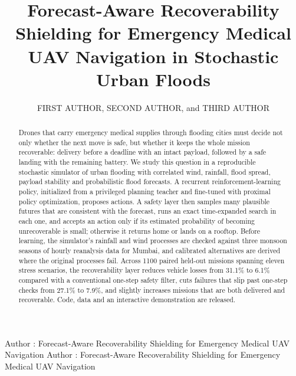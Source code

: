 \documentclass{ieeeaccess}
\begin{document}

\title{Forecast-Aware Recoverability Shielding for Emergency Medical UAV Navigation in Stochastic Urban Floods}

\author{\uppercase{First Author},
\uppercase{Second Author}, and \uppercase{Third Author}}
\address[1]{Department of Computer Science and Engineering, University Name, City, Country (e-mail: first.author@university.edu)}
\address[2]{Department of Computer Science and Engineering, University Name, City, Country (e-mail: third.author@university.edu)}

\markboth
{Author \headeretal: Forecast-Aware Recoverability Shielding for Emergency Medical UAV Navigation}
{Author \headeretal: Forecast-Aware Recoverability Shielding for Emergency Medical UAV Navigation}


\begin{abstract}
Drones that carry emergency medical supplies through flooding cities must decide not only whether the next move is safe, but whether it keeps the whole mission recoverable: delivery before a deadline with an intact payload, followed by a safe landing with the remaining battery. We study this question in a reproducible stochastic simulator of urban flooding with correlated wind, rainfall, flood spread, payload stability and probabilistic flood forecasts. A recurrent reinforcement-learning policy, initialized from a privileged planning teacher and fine-tuned with proximal policy optimization, proposes actions. A safety layer then samples many plausible futures that are consistent with the forecast, runs an exact time-expanded search in each one, and accepts an action only if its estimated probability of becoming unrecoverable is small; otherwise it returns home or lands on a rooftop. Before learning, the simulator's rainfall and wind processes are checked against three monsoon seasons of hourly reanalysis data for Mumbai, and calibrated alternatives are derived where the original processes fail. Across 1100 paired held-out missions spanning eleven stress scenarios, the recoverability layer reduces vehicle losses from 31.1\% to 6.1\% compared with a conventional one-step safety filter, cuts failures that slip past one-step checks from 27.1\% to 7.9\%, and slightly increases missions that are both delivered and recoverable. Code, data and an interactive demonstration are released.
\end{abstract}
\end{document}
